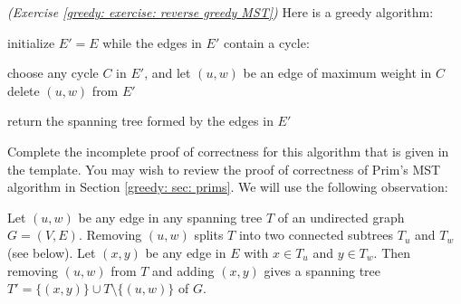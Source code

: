 \documentclass[11pt]{article}
\begin{document}
\newpage

\setlength{\ITEMHT}{1.9in}
{\injectEnumerate
}




\newpage

\problem\emph{(Exercise \ref{greedy: exercise: reverse greedy MST})}
Here is a greedy  algorithm:

\begin{myframed}
  \begin{steps}
  \item[{{\sf cycleBreaker}$(G=(V,E))$:}]
    \step initialize $E' = E$
    \step while the edges in $E'$ contain a cycle:
    \begin{block}
      \step choose any cycle $C$ in $E'$, and let $(u, w)$ be an edge of maximum weight in $C$
      \step delete $(u, w)$ from $E'$
    \end{block}
    \step return the spanning tree formed by the edges in $E'$
  \end{steps}
\end{myframed}

Complete the incomplete proof of correctness for this algorithm that is given in the template.
You may wish to review the proof of correctness of Prim's MST algorithm in Section \ref{greedy: sec: prims}.
We will use the following observation:


\begin{observation}\label{exchange}
  Let $(u,w)$ be any edge in any spanning tree $T$ of an undirected graph $G=(V,E)$.
  Removing $(u,w)$ splits $T$ into two connected subtrees $T_u$ and $T_w$ (see below).
  Let $(x,y)$ be any edge in $E$ with $x\in T_u$ and $y\in T_w$.
  Then removing $(u, w)$ from $T$ and adding $(x, y)$ 
  gives a spanning tree $T'=\{(x, y)\}\cup T \setminus \{(u, w)\}$ of $G$.
\end{observation}
\end{document}
